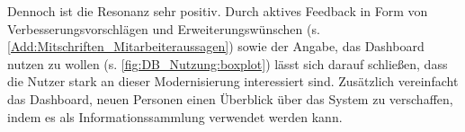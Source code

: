 Dennoch ist die Resonanz sehr positiv. Durch aktives Feedback in Form von Verbesserungsvorschlägen und Erweiterungswünschen (s. \autoref{Add:Mitschriften_Mitarbeiteraussagen}) sowie der Angabe, das Dash\-board nutzen zu wollen (s. \autoref{fig:DB_Nutzung:boxplot}) lässt sich darauf schließen, dass die Nutzer stark an dieser Modernisierung interessiert sind.
Zusätzlich vereinfacht das Dash\-board, neuen Personen einen Überblick über das System zu verschaffen, indem es als Informationssammlung verwendet werden kann.


